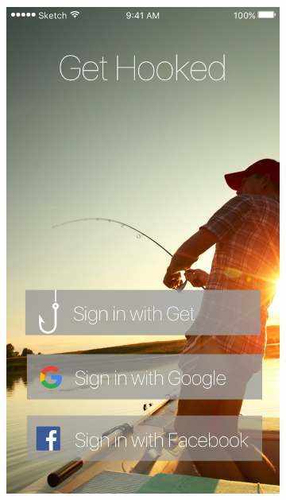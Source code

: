 \vfill
\begin{figure}[H]
  \hfill
  \begin{subfigure}[t]{0.23\textwidth}
  	  \centering
  	  \includegraphics[width=\textwidth]{images/Introscreen.png}
  \end{subfigure}
  \hfill
  \begin{subfigure}[t]{0.23\textwidth}
  	  \centering

\end{subfigure}
\end{figure}

